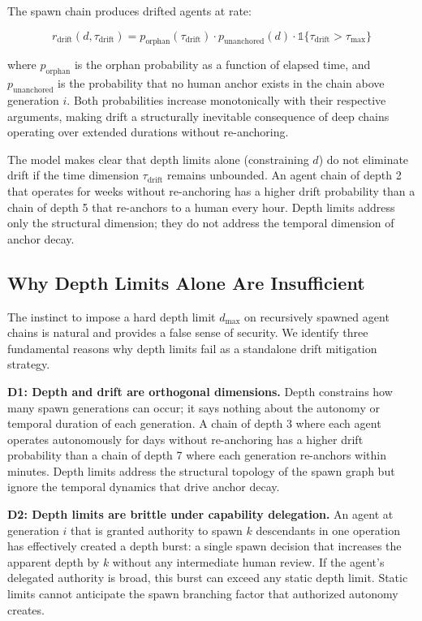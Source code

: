 The spawn chain produces drifted agents at rate:

\[
r_{\text{drift}}(d, \tau_{\text{drift}}) = p_{\text{orphan}}(\tau_{\text{drift}}) \cdot p_{\text{unanchored}}(d) \cdot \mathbb{1}\{\tau_{\text{drift}} > \tau_{\text{max}}\}
\]

where $p_{\text{orphan}}$ is the orphan probability as a function of elapsed time, and $p_{\text{unanchored}}$ is the probability that no human anchor exists in the chain above generation $i$. Both probabilities increase monotonically with their respective arguments, making drift a structurally inevitable consequence of deep chains operating over extended durations without re-anchoring.

The model makes clear that depth limits alone (constraining $d$) do not eliminate drift if the time dimension $\tau_{\text{drift}}$ remains unbounded. An agent chain of depth 2 that operates for weeks without re-anchoring has a higher drift probability than a chain of depth 5 that re-anchors to a human every hour. Depth limits address only the structural dimension; they do not address the temporal dimension of anchor decay.

\subsection{Why Depth Limits Alone Are Insufficient}

The instinct to impose a hard depth limit $d_{\max}$ on recursively spawned agent chains is natural and provides a false sense of security. We identify three fundamental reasons why depth limits fail as a standalone drift mitigation strategy.

\textbf{D1: Depth and drift are orthogonal dimensions.} Depth constrains how many spawn generations can occur; it says nothing about the autonomy or temporal duration of each generation. A chain of depth 3 where each agent operates autonomously for days without re-anchoring has a higher drift probability than a chain of depth 7 where each generation re-anchors within minutes. Depth limits address the structural topology of the spawn graph but ignore the temporal dynamics that drive anchor decay.

\textbf{D2: Depth limits are brittle under capability delegation.} An agent at generation $i$ that is granted authority to spawn $k$ descendants in one operation has effectively created a depth burst: a single spawn decision that increases the apparent depth by $k$ without any intermediate human review. If the agent's delegated authority is broad, this burst can exceed any static depth limit. Static limits cannot anticipate the spawn branching factor that authorized autonomy creates.

